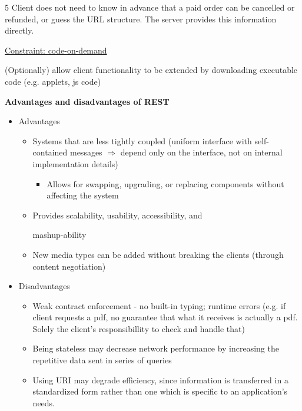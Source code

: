 \documentclass[landscape,a4paper]{extarticle}
\begin{document}
\begin{multicols*}{5}
    Client does not need to know in advance that a paid order can be cancelled or refunded, or guess the URL structure.
    The server provides this information directly. 

    \uline{Constraint: code-on-demand}

    (Optionally) allow client functionality to be extended by downloading executable code 
    (e.g. applets, js code)

    \textbf{Advantages and disadvantages of REST}

    \begin{itemize}
        \item Advantages
        \begin{itemize}
            \item Systems that are less tightly coupled (uniform interface with
            self-contained messages $\Rightarrow$ depend only on the interface, not on internal implementation details)
            \begin{itemize}
                \item Allows for swapping, upgrading, or replacing components without affecting the system
            \end{itemize}
            \item Provides scalability, usability, accessibility, and
            
            mashup-ability
            \item New media types can be added without breaking the clients (through content negotiation)
        \end{itemize}
        \item Disadvantages
        \begin{itemize}
            \item Weak contract enforcement - no built-in typing; runtime errors (e.g.
            if client requests a pdf, no guarantee that what it receives is actually a pdf.
            Solely the client's responsibillity to check and handle that)
            \item Being stateless may decrease network performance by increasing the repetitive data sent in series of queries
            \item Using URI may degrade efficiency, since information is transferred in a standardized form rather than one which is specific to an application's needs.
        \end{itemize}
    \end{itemize}


\end{multicols*}
\end{document}
